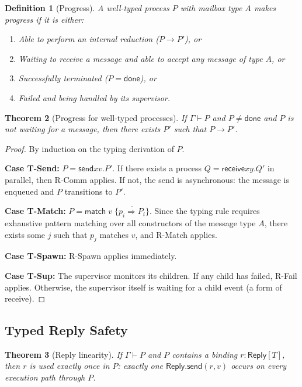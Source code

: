 \documentclass[11pt,a4paper]{article}
\newtheorem{theorem}{Theorem}[section]
\newtheorem{definition}[theorem]{Definition}
\newcommand{\sendf}{\mathsf{send}}
\newcommand{\recvf}{\mathsf{receive}}
\newcommand{\donef}{\mathsf{done}}
\begin{document}
\begin{definition}[Progress]\label{def:progress}
A well-typed process $P$ with mailbox type $A$ \emph{makes progress} if it is either:
\begin{enumerate}
\item Able to perform an internal reduction ($P \rightarrow P'$), or
\item Waiting to receive a message and able to accept any message of type $A$, or
\item Successfully terminated ($P = \donef$), or
\item Failed and being handled by its supervisor.
\end{enumerate}
\end{definition}

\begin{theorem}[Progress for well-typed processes]\label{thm:progress}
If $\Gamma \vdash P$ and $P \neq \donef$ and $P$ is not waiting for a message, then there exists $P'$ such that $P \rightarrow P'$.
\end{theorem}

\begin{proof}
By induction on the typing derivation of $P$.

\textbf{Case T-Send:} $P = \sendf{x}{v}.P'$. If there exists a process $Q = \recvf{x}{y}.Q'$ in parallel, then R-Comm applies. If not, the send is asynchronous: the message is enqueued and $P$ transitions to $P'$.

\textbf{Case T-Match:} $P = \mathsf{match}\; v\; \{\overline{p_i \Rightarrow P_i}\}$. Since the typing rule requires exhaustive pattern matching over all constructors of the message type $A$, there exists some $j$ such that $p_j$ matches $v$, and R-Match applies.

\textbf{Case T-Spawn:} R-Spawn applies immediately.

\textbf{Case T-Sup:} The supervisor monitors its children. If any child has failed, R-Fail applies. Otherwise, the supervisor itself is waiting for a child event (a form of receive).
\end{proof}

\subsection{Typed Reply Safety}

\begin{theorem}[Reply linearity]\label{thm:reply-linearity}
If $\Gamma \vdash P$ and $P$ contains a binding $r : \mathsf{Reply}[T]$, then $r$ is used exactly once in $P$: exactly one $\mathsf{Reply.send}(r, v)$ occurs on every execution path through $P$.
\end{theorem}
\end{document}
